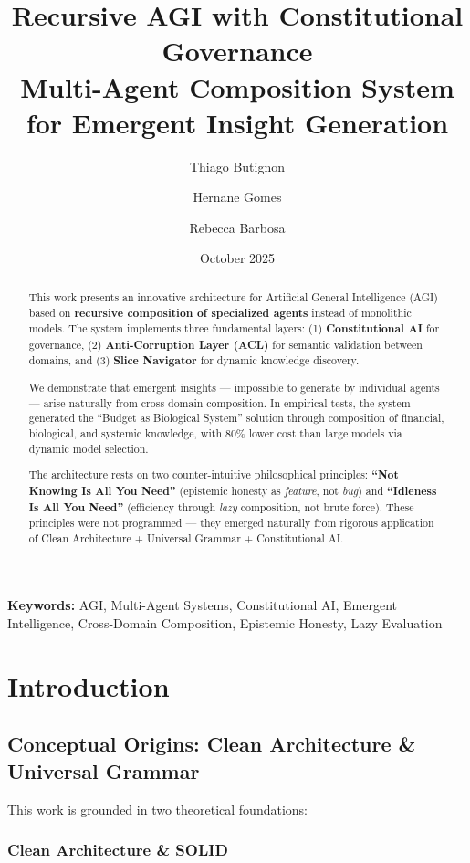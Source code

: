 \documentclass[11pt]{article}
\title{\textbf{Recursive AGI with Constitutional Governance}\\
\large Multi-Agent Composition System for Emergent Insight Generation}
\author{
    Thiago Butignon
    \and
    Hernane Gomes
    \and
    Rebecca Barbosa
}
\date{October 2025}
\begin{document}
\maketitle

\begin{abstract}
This work presents an innovative architecture for Artificial General Intelligence (AGI) based on \textbf{recursive composition of specialized agents} instead of monolithic models. The system implements three fundamental layers: (1) \textbf{Constitutional AI} for governance, (2) \textbf{Anti-Corruption Layer (ACL)} for semantic validation between domains, and (3) \textbf{Slice Navigator} for dynamic knowledge discovery.

We demonstrate that emergent insights --- impossible to generate by individual agents --- arise naturally from cross-domain composition. In empirical tests, the system generated the ``Budget as Biological System'' solution through composition of financial, biological, and systemic knowledge, with 80\% lower cost than large models via dynamic model selection.

The architecture rests on two counter-intuitive philosophical principles: \textbf{``Not Knowing Is All You Need''} (epistemic honesty as \textit{feature}, not \textit{bug}) and \textbf{``Idleness Is All You Need''} (efficiency through \textit{lazy} composition, not brute force). These principles were not programmed --- they emerged naturally from rigorous application of Clean Architecture + Universal Grammar + Constitutional AI.
\end{abstract}

\noindent\textbf{Keywords:} AGI, Multi-Agent Systems, Constitutional AI, Emergent Intelligence, Cross-Domain Composition, Epistemic Honesty, Lazy Evaluation

\section{Introduction}

\subsection{Conceptual Origins: Clean Architecture \& Universal Grammar}

This work is grounded in two theoretical foundations:

\subsubsection{Clean Architecture \& SOLID}
\end{document}
